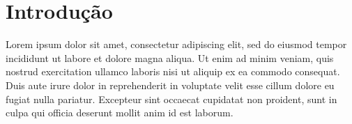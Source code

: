 \documentclass[
12pt,				    %
openright,			    %
oneside,			    %
a4paper,			    %
sumario=tradicional,    %
english,			    %
brazil,				    %
]{abntex2}              %
\begin{document}
	\listoffigures*
	\cleardoublepage
	
	\listoftables*
	\cleardoublepage
	
	
	
	
	
	
	
	\tableofcontents*
	\cleardoublepage
	
	
	
	\textual
	
	
	\chapter{Introdução}\label{sec:introducao}
	Lorem ipsum dolor sit amet, consectetur adipiscing elit, sed do eiusmod tempor incididunt ut labore et dolore magna aliqua. Ut enim ad minim veniam, quis nostrud exercitation ullamco laboris nisi ut aliquip ex ea commodo consequat. Duis aute irure dolor in reprehenderit in voluptate velit esse cillum dolore eu fugiat nulla pariatur. Excepteur sint occaecat cupidatat non proident, sunt in culpa qui officia deserunt mollit anim id est laborum.
		
\end{document}
